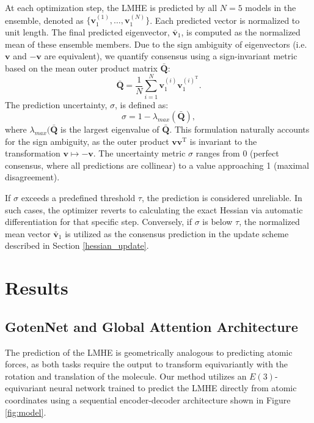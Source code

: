 \documentclass[12pt]{article}
\begin{document}
At each optimization step, the LMHE is predicted by all $N=5$ models in the ensemble, denoted as $\{\mathbf{v}_1^{(1)}, \dots , \mathbf{v}_1^{(N)}\}$. Each predicted vector is normalized to unit length. The final predicted eigenvector, $\bar{\mathbf{v}}_1$, is computed as the normalized mean of these ensemble members. Due to the sign ambiguity of eigenvectors (i.e. $\mathbf{v}$ and $-\mathbf{v}$ are equivalent), we quantify consensus using a sign-invariant metric based on the mean outer product matrix $\bar{\mathbf{Q}}$:
\begin{equation}
    \bar{\mathbf{Q}}=\frac{1}{N}\sum_{i=1}^{N} \mathbf{v}_1^{(i)} \mathbf{v}_1^{(i)^{\mathrm{T}}}.
\end{equation}
The prediction uncertainty, $\sigma$, is defined as:
\begin{equation}
    \sigma=1-\lambda_{max}(\bar{\mathbf{Q}}),
\end{equation}
where $\lambda_{max}(\bar{\mathbf{Q}}$ is the largest eigenvalue of $\bar{\mathbf{Q}}$. This formulation naturally accounts for the sign ambiguity, as the outer product $\mathbf{v}\mathbf{v}^{\mathrm{T}}$ is invariant to the transformation $\mathbf{v}\mapsto -\mathbf{v}$. The uncertainty metric $\sigma$ ranges from 0 (perfect consensus, where all predictions are collinear) to a value approaching 1 (maximal disagreement).\par

If $\sigma$ exceeds a predefined threshold $\tau$, the prediction is considered unreliable. In such cases, the optimizer reverts to calculating the exact Hessian via automatic differentiation for that specific step. Conversely, if $\sigma$ is below $\tau$, the normalized mean vector $\bar{\mathbf{v}}_1$ is utilized as the consensus prediction in the update scheme described in Section \ref{hessian_update}.

\section{Results}

\subsection{GotenNet and Global Attention Architecture}
The prediction of the LMHE is geometrically analogous to predicting atomic forces, as both tasks require the output to transform equivariantly with the rotation and translation of the molecule. Our method utilizes an $E(3)$-equivariant neural network trained to predict the LMHE directly from atomic coordinates using a sequential encoder-decoder architecture shown in Figure \ref{fig:model}. 
\end{document}
